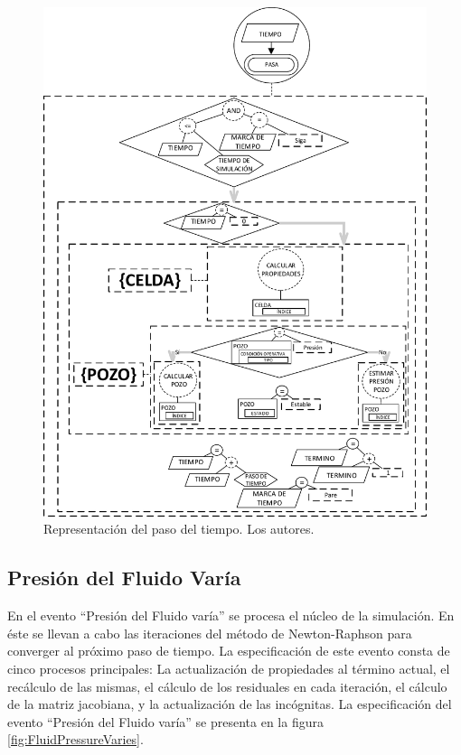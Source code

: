 \begin{figure}[h]
	\centering%
	\includegraphics[width=0.7\linewidth]{Fig/TiempoPasa.pdf}%
	\caption[Representación del paso del tiempo.]{Representación del paso del tiempo. Los autores.} \label{fig:TimePasses}
\end{figure}


\subsection{Presión del Fluido Varía}\label{sec:PS_FluidVaries}
En el evento ``Presión del Fluido varía'' se procesa el núcleo de la simulación. En éste se llevan a cabo las iteraciones del método de Newton-Raphson para converger al próximo paso de tiempo. La especificación de este evento consta de cinco procesos principales: La actualización de propiedades al término actual, el recálculo de las mismas, el cálculo de los residuales en cada iteración, el cálculo de la matriz jacobiana, y la actualización de las incógnitas. La especificación del evento ``Presión del Fluido varía'' se presenta en la figura \ref{fig:FluidPressureVaries}.\\


